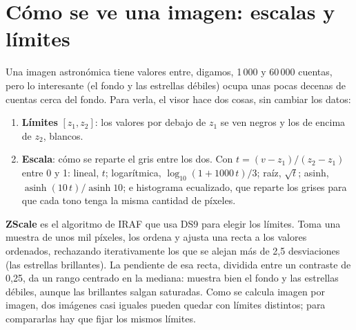 \section{Cómo se ve una imagen: escalas y límites}

Una imagen astronómica tiene valores entre, digamos, 1\,000 y 60\,000 cuentas, pero lo interesante (el fondo y las
estrellas débiles) ocupa unas pocas decenas de cuentas cerca del fondo. Para verla, el visor hace dos cosas, sin cambiar
los datos:
\begin{enumerate}
\item \textbf{Límites} $[z_1, z_2]$: los valores por debajo de $z_1$ se ven negros y los de encima de $z_2$, blancos.
\item \textbf{Escala}: cómo se reparte el gris entre los dos. Con $t = (v - z_1)/(z_2 - z_1)$ entre 0 y 1:
lineal, $t$; logarítmica, $\log_{10}(1 + 1000\,t)/3$; raíz, $\sqrt t$; asinh, $\operatorname{asinh}(10\,t)/\operatorname{asinh}10$;
e histograma ecualizado, que reparte los grises para que cada tono tenga la misma cantidad de píxeles.
\end{enumerate}

\textbf{ZScale} es el algoritmo de IRAF que usa DS9 para elegir los límites. Toma una muestra de unos mil píxeles, los
ordena y ajusta una recta a los valores ordenados, rechazando iterativamente los que se alejan más de 2,5 desviaciones
(las estrellas brillantes). La pendiente de esa recta, dividida entre un contraste de 0,25, da un rango centrado en la
mediana: muestra bien el fondo y las estrellas débiles, aunque las brillantes salgan saturadas. Como se calcula imagen por
imagen, dos imágenes casi iguales pueden quedar con límites distintos; para compararlas hay que fijar los mismos límites.
